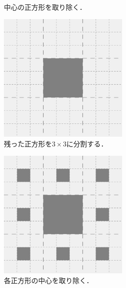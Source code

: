 \documentclass[dvipdfmx]{jsarticle}
\theoremstyle{definition}
\begin{document}
\begin{figure}[H]
\begin{subfigure}{0.325\textwidth}
        \caption{中心の正方形を取り除く．}
    \end{subfigure}
    \begin{subfigure}{0.325\textwidth}
        \centering
        \includegraphics[width=0.7\textwidth]{figure/carpet/carpet_2_split.png}
        \caption{残った正方形を$3 \times 3$に分割する．}
    \end{subfigure}
    \begin{subfigure}{0.325\textwidth}
        \centering
        \includegraphics[width=0.7\textwidth]{figure/carpet/carpet_2_fill.png}
        \caption{各正方形の中心を取り除く．}
    \end{subfigure}
    \begin{subfigure}{0.325\textwidth}
        \centering

\end{subfigure}
\end{figure}
\end{document}

